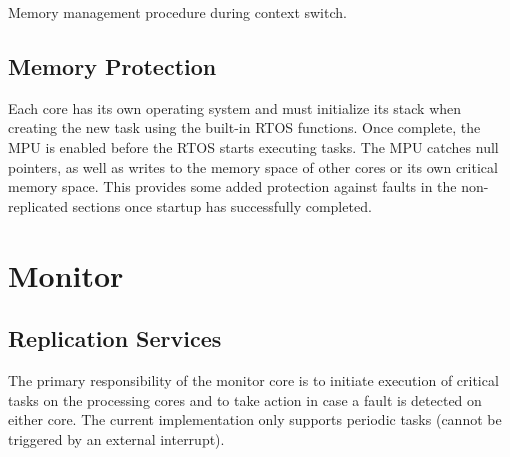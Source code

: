 \begin{algorithm}
	\caption{Memory management procedure during context switch.}
	\label{a:mem-manager}
\end{algorithm}




\subsection{Memory Protection}
\label{s:mem-prot}
	Each core has its own operating system and must initialize its stack when creating the new task using the built-in RTOS functions. 
	Once complete, the MPU is enabled before the RTOS starts executing tasks. 
	The MPU catches null pointers, as well as writes to the memory space of other cores or its own critical memory space. 
	This provides some added protection against faults in the non-replicated sections once startup has successfully completed.

\section{Monitor}
\label{s:mon}
	


\subsection{Replication Services}
	The primary responsibility of the monitor core is to initiate execution of critical tasks on the processing cores and to take action in case a fault is detected on either core. 
	The current implementation only supports periodic tasks (cannot be triggered by an external interrupt). 
	
